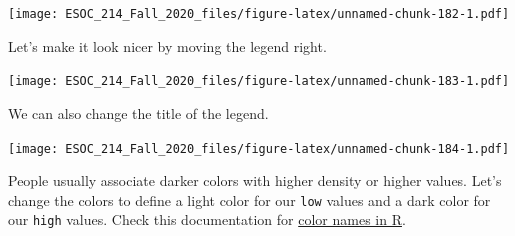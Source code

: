 \documentclass[
]{book}
\newenvironment{Shaded}{\begin{snugshade}}{\end{snugshade}}
\newcommand{\DataTypeTok}[1]{\textcolor[rgb]{0.13,0.29,0.53}{#1}}
\newcommand{\KeywordTok}[1]{\textcolor[rgb]{0.13,0.29,0.53}{\textbf{#1}}}
\newcommand{\NormalTok}[1]{#1}
\newcommand{\OperatorTok}[1]{\textcolor[rgb]{0.81,0.36,0.00}{\textbf{#1}}}
\newcommand{\StringTok}[1]{\textcolor[rgb]{0.31,0.60,0.02}{#1}}
\begin{document}
\texttt{[image: ESOC\_214\_Fall\_2020\_files/figure-latex/unnamed-chunk-182-1.pdf]}

Let's make it look nicer by moving the legend right.

\begin{Shaded}
\end{Shaded}

\texttt{[image: ESOC\_214\_Fall\_2020\_files/figure-latex/unnamed-chunk-183-1.pdf]}

We can also change the title of the legend.

\begin{Shaded}
\end{Shaded}

\texttt{[image: ESOC\_214\_Fall\_2020\_files/figure-latex/unnamed-chunk-184-1.pdf]}

People usually associate darker colors with higher density or higher values. Let's change the colors to define a light color for our \texttt{low} values and a dark color for our \texttt{high} values. Check this documentation for \href{http://www.stat.columbia.edu/~tzheng/files/Rcolor.pdf}{color names in R}.

\begin{Shaded}
\end{Shaded}
\end{document}
